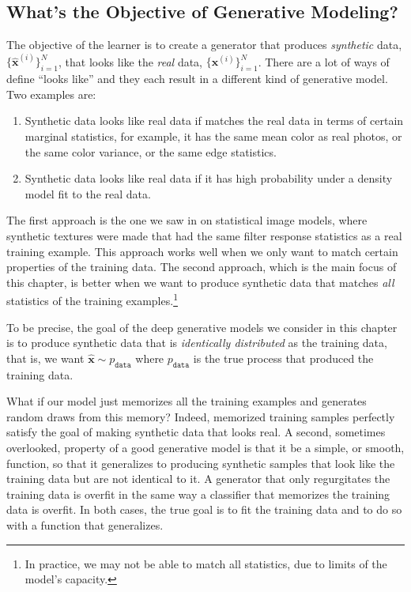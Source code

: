 \subsection{What's the Objective of Generative Modeling?}
The objective of the learner is to create a generator that produces \textit{synthetic} data, $\{\hat{\mathbf{x}}^{(i)}\}_{i=1}^N$, that looks like the \textit{real} data, $\{\mathbf{x}^{(i)}\}_{i=1}^N$. There are a lot of ways of define ``looks like'' and they each result in a different kind of generative model. Two examples are:
\begin{enumerate}
    \item Synthetic data looks like real data if matches the real data in terms of certain marginal statistics, for example, it has the same mean color as real photos, or the same color variance, or the same edge statistics.
    \item Synthetic data looks like real data if it has high probability under a density model fit to the real data.
\end{enumerate}
The first approach is the one we saw in \chap{\ref{chapter:stat_image_models}} on statistical image models, where synthetic textures were made that had the same filter response statistics as a real training example. This approach works well when we only want to match certain properties of the training data. The second approach, which is the main focus of this chapter, is better when we want to produce synthetic data that matches \textit{all} statistics of the training examples.\footnote{In practice, we may not be able to match all statistics, due to limits of the model's capacity.}

To be precise, the goal of the deep generative models we consider in this chapter is to produce synthetic data that is \textit{identically distributed} as the training data, that is, we want $\hat{\mathbf{x}} \sim p_{\texttt{data}}$ where $p_{\texttt{data}}$ is the true process that produced the training data. %

What if our model just memorizes all the training examples and generates random draws from this memory? Indeed, memorized training samples perfectly satisfy the goal of making synthetic data that looks real. A second, sometimes overlooked, property of a good generative model is that it be a simple, or smooth, function, so that it generalizes to producing synthetic samples that look like the training data but are not identical to it. A generator that only regurgitates the training data is overfit in the same way a classifier that memorizes the training data is overfit. In both cases, the true goal is to fit the training data and to do so with a function that generalizes.

